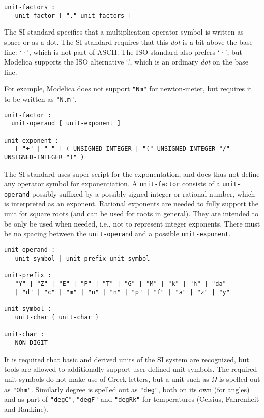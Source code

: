 \begin{lstlisting}[language=grammar]
unit-factors :
   unit-factor [ "." unit-factors ]
\end{lstlisting}

The SI standard specifies that a multiplication operator symbol is written as space or as a dot.
The SI standard requires that this \emph{dot} is a bit above the base line: `·', which is not part of ASCII.
The ISO standard also prefers `·', but Modelica supports the ISO alternative `.', which is an ordinary \emph{dot} on the base line.

For example, Modelica does not support \lstinline!"Nm"! for newton-meter, but requires it to be written as \lstinline!"N.m"!.

\begin{lstlisting}[language=grammar]
unit-factor :
  unit-operand [ unit-exponent ]

unit-exponent :
   [ "+" | "-" ] ( UNSIGNED-INTEGER | "(" UNSIGNED-INTEGER "/" UNSIGNED-INTEGER ")" )
\end{lstlisting}

The SI standard uses super-script for the exponentation, and does thus not define any operator symbol for exponentiation.
A \lstinline[language=grammar]!unit-factor! consists of a \lstinline[language=grammar]!unit-operand! possibly suffixed by a possibly signed integer or rational number, which is interpreted as an exponent.
Rational exponents are needed to fully support the unit for square roots (and can be used for roots in general).
They are intended to be only be used when needed, i.e., not to represent integer exponents.
There must be no spacing between the \lstinline[language=grammar]!unit-operand! and a possible \lstinline[language=grammar]!unit-exponent!.

\begin{lstlisting}[language=grammar]
unit-operand :
   unit-symbol | unit-prefix unit-symbol

unit-prefix :
   "Y" | "Z" | "E" | "P" | "T" | "G" | "M" | "k" | "h" | "da"
   | "d" | "c" | "m" | "u" | "n" | "p" | "f" | "a" | "z" | "y"

unit-symbol :
   unit-char { unit-char }

unit-char :
   NON-DIGIT
\end{lstlisting}

It is required that basic and derived units of the SI system are recognized, but tools are allowed to additionally support user-defined unit symbols.
The required unit symbols do not make use of Greek letters, but a unit such as $\Omega$ is spelled out as \lstinline!"Ohm"!.
Similarly degree is spelled out as \lstinline!"deg"!, both on its own (for angles) and as part of \lstinline!"degC"!, \lstinline!"degF"! and \lstinline!"degRk"! for temperatures (Celsius, Fahrenheit and Rankine).

